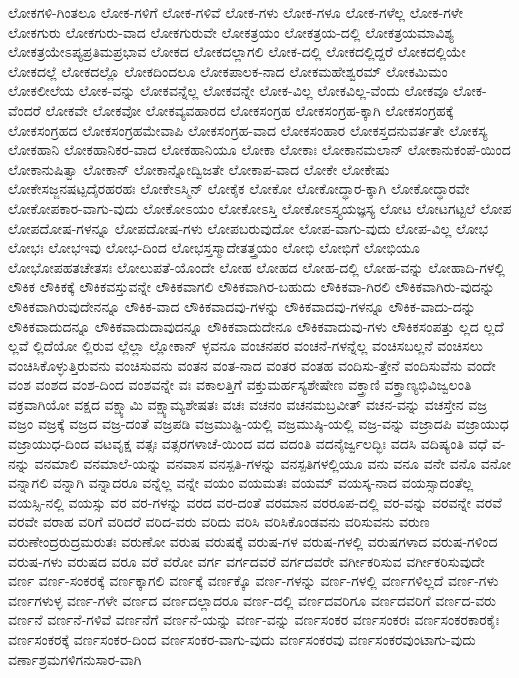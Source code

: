 {ಲೋಕಗಳಿ-ಗಿಂತಲೂ
ಲೋಕ-ಗಳಿಗೆ
ಲೋಕ-ಗಳಿವೆ
ಲೋಕ-ಗಳು
ಲೋಕ-ಗಳೂ
ಲೋಕ-ಗಳೆಲ್ಲ
ಲೋಕ-ಗಳೇ
ಲೋಕಗುರು
ಲೋಕಗುರು-ವಾದ
ಲೋಕಗುರುವೇ
ಲೋಕತ್ರಯಂ
ಲೋಕತ್ರಯ-ದಲ್ಲಿ
ಲೋಕತ್ರಯಮಾವಿಶ್ಯ
ಲೋಕತ್ರಯೇಽಪ್ಯಪ್ರತಿಮಪ್ರಭಾವ
ಲೋಕದ
ಲೋಕದಲ್ಲಾಗಲಿ
ಲೋಕ-ದಲ್ಲಿ
ಲೋಕದಲ್ಲಿದ್ದರೆ
ಲೋಕದಲ್ಲಿಯೇ
ಲೋಕದಲ್ಲೆ
ಲೋಕದಲ್ಲೊ
ಲೋಕದಿಂದಲೂ
ಲೋಕಪಾಲಕ-ನಾದ
ಲೋಕಮಹೇಶ್ವರಮ್
ಲೋಕಮಿಮಂ
ಲೋಕಲೀಲೆಯ
ಲೋಕ-ವನ್ನು
ಲೋಕವನ್ನೆಲ್ಲ
ಲೋಕವನ್ನೇ
ಲೋಕ-ವಿಲ್ಲ
ಲೋಕವಿಲ್ಲ-ವೆಂದು
ಲೋಕವೂ
ಲೋಕ-ವೆಂದರೆ
ಲೋಕವೇ
ಲೋಕವೋ
ಲೋಕವ್ಯವಹಾರದ
ಲೋಕಸಂಗ್ರಹ
ಲೋಕಸಂಗ್ರಹ-ಕ್ಕಾಗಿ
ಲೋಕಸಂಗ್ರಹಕ್ಕೆ
ಲೋಕಸಂಗ್ರಹದ
ಲೋಕಸಂಗ್ರಹಮೇವಾಪಿ
ಲೋಕಸಂಗ್ರಹ-ವಾದ
ಲೋಕಸಂಹಾರ
ಲೋಕಸ್ತದನುವರ್ತತೇ
ಲೋಕಸ್ಯ
ಲೋಕಹಾನಿ
ಲೋಕಹಾನಿಕರ-ವಾದ
ಲೋಕಹಾನಿಯೂ
ಲೋಕಾ
ಲೋಕಾಃ
ಲೋಕಾನಮಲಾನ್
ಲೋಕಾನುಕಂಪೆ-ಯಿಂದ
ಲೋಕಾನುಷಿತ್ವಾ
ಲೋಕಾನ್
ಲೋಕಾನ್ನೋದ್ವಿಜತೇ
ಲೋಕಾಪ-ವಾದ
ಲೋಕೇ
ಲೋಕೇಷು
ಲೋಕೇಸಜ್ಜನಷಟ್ಪದೈರಹರಹಃ
ಲೋಕೇಽಸ್ಮಿನ್
ಲೋಕೈಕ
ಲೋಕೋ
ಲೋಕೋದ್ಧಾರ-ಕ್ಕಾಗಿ
ಲೋಕೋದ್ಧಾರವೇ
ಲೋಕೋಪಕಾರ-ವಾಗು-ವುದು
ಲೋಕೋಽಯಂ
ಲೋಕೋಽಸ್ತಿ
ಲೋಕೋಽಸ್ತ್ಯಯಜ್ಞಸ್ಯ
ಲೋಟ
ಲೋಟಗಟ್ಟಲೆ
ಲೋಪ
ಲೋಪದೋಷ-ಗಳನ್ನೂ
ಲೋಪದೋಷ-ಗಳು
ಲೋಪಬರುವುದೋ
ಲೋಪ-ವಾಗು-ವುದು
ಲೋಪ-ವಿಲ್ಲ
ಲೋಭ
ಲೋಭಃ
ಲೋಭಇವು
ಲೋಭ-ದಿಂದ
ಲೋಭಸ್ತಸ್ಮಾದೇತತ್ತ್ರಯಂ
ಲೋಭಿ
ಲೋಭಿಗೆ
ಲೋಭಿಯೂ
ಲೋಭೋಪಹತಚೇತಸಃ
ಲೋಲುಪತೆ-ಯೊಂದೇ
ಲೋಹ
ಲೋಹದ
ಲೋಹ-ದಲ್ಲಿ
ಲೋಹ-ವನ್ನು
ಲೋಹಾದಿ-ಗಳಲ್ಲಿ
ಲೌಕಿಕ
ಲೌಕಿಕಕ್ಕೆ
ಲೌಕಿಕವಸ್ತುವನ್ನೇ
ಲೌಕಿಕವಾಗಲಿ
ಲೌಕಿಕವಾಗಿರ-ಬಹುದು
ಲೌಕಿಕವಾ-ಗಿರಲಿ
ಲೌಕಿಕವಾಗಿರು-ವುದನ್ನು
ಲೌಕಿಕವಾಗಿರುವುದೇನನ್ನೂ
ಲೌಕಿಕ-ವಾದ
ಲೌಕಿಕವಾದವು-ಗಳನ್ನು
ಲೌಕಿಕವಾದವು-ಗಳನ್ನೂ
ಲೌಕಿಕ-ವಾದು-ದನ್ನು
ಲೌಕಿಕವಾದುದನ್ನೂ
ಲೌಕಿಕವಾದುದಾವುದನ್ನೂ
ಲೌಕಿಕವಾದುದೇನೂ
ಲೌಕಿಕವಾದುವು-ಗಳು
ಲೌಕಿಕಸಂಪತ್ತು
ಲ್ಲದ
ಲ್ಲದೆ
ಲ್ಲವೆ
ಲ್ಲಿದೆಯೋ
ಲ್ಲಿರುವ
ಲ್ಲೆಲ್ಲಾ
ಲ್ಲೋಕಾನ್
ಳ್ಳವನೂ
ವಂಚನಪರ
ವಂಚನೆ-ಗಳನ್ನೆಲ್ಲ
ವಂಚಿಸಬಲ್ಲನೆ
ವಂಚಿಸಲು
ವಂಚಿಸಿಕೊಳ್ಳುತ್ತಿರುವನು
ವಂಚಿಸುವನು
ವಂತನ
ವಂತ-ನಾದ
ವಂತರ
ವಂತಹ
ವಂದಿಸು-ತ್ತೇನೆ
ವಂದಿಸುವೆನು
ವಂದೇ
ವಂಶ
ವಂಶದ
ವಂಶ-ದಿಂದ
ವಂಶವನ್ನೇ
ವಃ
ವಕಾಲತ್ತಿಗೆ
ವಕ್ತುಮರ್ಹಸ್ಯಶೇಷೇಣ
ವಕ್ತ್ರಾಣಿ
ವಕ್ತ್ರಾಣ್ಯಭಿವಿಜ್ವಲಂತಿ
ವಕ್ರವಾಗಿಯೋ
ವಕ್ಷದ
ವಕ್ಷ್ಯಾಮಿ
ವಕ್ಷ್ಯಾಮ್ಯಶೇಷತಃ
ವಚಃ
ವಚನಂ
ವಚನಮಬ್ರವೀತ್
ವಚನ-ವನ್ನು
ವಚಸ್ತೇನ
ವಜ್ರ
ವಜ್ರಂ
ವಜ್ರಕ್ಕೆ
ವಜ್ರದ
ವಜ್ರ-ದಂತೆ
ವಜ್ರಪಡಿ
ವಜ್ರಮುಷ್ಟಿ-ಯಲ್ಲಿ
ವಜ್ರಮುಷ್ಠಿ-ಯಲ್ಲಿ
ವಜ್ರ-ವನ್ನು
ವಜ್ರಾದಪಿ
ವಜ್ರಾಯುಧ
ವಜ್ರಾಯುಧ-ದಿಂದ
ವಟವೃಕ್ಷ
ವತ್ಸಃ
ವತ್ಸರಗಳಾಚೆ-ಯಿಂದ
ವದ
ವದಂತಿ
ವದನೈರ್ಜ್ವಲದ್ಭಿಃ
ವದಸಿ
ವದಿಷ್ಯಂತಿ
ವಧೆ
ವ-ನನ್ನು
ವನಮಾಲಿ
ವನಮಾಲೆ-ಯನ್ನು
ವನವಾಸ
ವನಸ್ಪತಿ-ಗಳನ್ನು
ವನಸ್ಪತಿಗಳಲ್ಲಿಯೂ
ವನು
ವನೂ
ವನೇ
ವನೊ
ವನೋ
ವನ್ನಾಗಲಿ
ವನ್ನಾಗಿ
ವನ್ನಾದರೂ
ವನ್ನೆಲ್ಲ
ವನ್ನೇ
ವಯಂ
ವಯಮತಃ
ವಯಮ್
ವಯಸ್ಕ-ನಾದ
ವಯಸ್ಸಾದಂತೆಲ್ಲ
ವಯಸ್ಸಿ-ನಲ್ಲಿ
ವಯಸ್ಸು
ವರ
ವರ-ಗಳನ್ನು
ವರದ
ವರ-ದಂತೆ
ವರಮಾನ
ವರರೂಪ-ದಲ್ಲಿ
ವರ-ವನ್ನು
ವರವನ್ನೇ
ವರವೆ
ವರವೇ
ವರಾಹ
ವರಿಗೆ
ವರಿದರೆ
ವರಿದ-ವರು
ವರಿದು
ವರಿಸಿ
ವರಿಸಿಕೊಂಡವನು
ವರಿಸುವನು
ವರುಣ
ವರುಣೇಂದ್ರರುದ್ರಮರುತಃ
ವರುಣೋ
ವರುಷ
ವರುಷಕ್ಕೆ
ವರುಷ-ಗಳ
ವರುಷ-ಗಳಲ್ಲಿ
ವರುಷಗಳಾದ
ವರುಷ-ಗಳಿಂದ
ವರುಷ-ಗಳು
ವರುಷದ
ವರೂ
ವರೆ
ವರೋ
ವರ್ಗ
ವರ್ಗದವರೆ
ವರ್ಗದವರೇ
ವರ್ಗೀಕರಿಸುವ
ವರ್ಗೀಕರಿಸುವುದೇ
ವರ್ಣ
ವರ್ಣ-ಸಂಕರಕ್ಕೆ
ವರ್ಣಕ್ಕಾಗಲಿ
ವರ್ಣಕ್ಕೆ
ವರ್ಣಕ್ಕೊ
ವರ್ಣ-ಗಳನ್ನು
ವರ್ಣ-ಗಳಲ್ಲಿ
ವರ್ಣಗಳಿಲ್ಲದೆ
ವರ್ಣ-ಗಳು
ವರ್ಣಗಳುಳ್ಳ
ವರ್ಣ-ಗಳೇ
ವರ್ಣದ
ವರ್ಣದಲ್ಲಾದರೂ
ವರ್ಣ-ದಲ್ಲಿ
ವರ್ಣದವರಿಗೂ
ವರ್ಣದವರಿಗೆ
ವರ್ಣದ-ವರು
ವರ್ಣನೆ
ವರ್ಣನೆ-ಗಳಿವೆ
ವರ್ಣನೆಗೆ
ವರ್ಣನೆ-ಯನ್ನು
ವರ್ಣ-ವನ್ನು
ವರ್ಣಸಂಕರ
ವರ್ಣಸಂಕರಃ
ವರ್ಣಸಂಕರಕಾರಕೈಃ
ವರ್ಣಸಂಕರಕ್ಕೆ
ವರ್ಣಸಂಕರ-ದಿಂದ
ವರ್ಣಸಂಕರ-ವಾಗು-ವುದು
ವರ್ಣಸಂಕರವು
ವರ್ಣಸಂಕರವುಂಟಾಗು-ವುದು
ವರ್ಣಾಶ್ರಮಗಳಿಗನುಸಾರ-ವಾಗಿ
}
